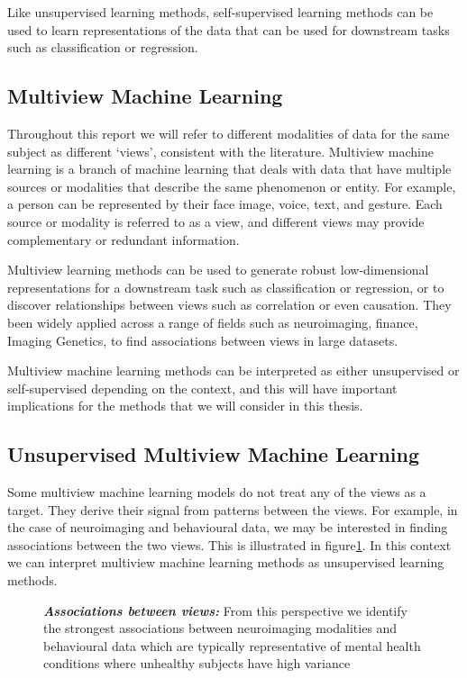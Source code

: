 Like unsupervised learning methods, self-supervised learning methods can be used to learn representations of the data that can be used for downstream tasks such as classification or regression.

\subsection{Multiview Machine Learning}

Throughout this report we will refer to different modalities of data for the same subject as different `views', consistent with the literature\cite{sun2013survey}. Multiview machine learning is a branch of machine learning that deals with data that have multiple sources or modalities that describe the same phenomenon or entity. For example, a person can be represented by their face image, voice, text, and gesture. Each source or modality is referred to as a view, and different views may provide complementary or redundant information.

Multiview learning methods can be used to generate robust low-dimensional representations for a downstream task such as classification or regression, or to discover relationships between views such as correlation or even causation. They been widely applied across a range of fields such as neuroimaging\cite{Krishnan2011}, finance\cite{cassel2000measurement}, Imaging Genetics\cite{Hansen2021}, to find associations between views in large datasets.

Multiview machine learning methods can be interpreted as either unsupervised or self-supervised depending on the context, and this will have important implications for the methods that we will consider in this thesis.

\subsection{Unsupervised Multiview Machine Learning}

Some multiview machine learning models do not treat any of the views as a target. They derive their signal from patterns between the views. For example, in the case of neuroimaging and behavioural data, we may be interested in finding associations between the two views. This is illustrated in figure\ref{fig:mentalhealthsunsupervised}. In this context we can interpret multiview machine learning methods as unsupervised learning methods.

\begin{figure}
    \centering
    \caption[Associations between views]{\textit{\textbf{Associations between views:}} From this perspective we identify the strongest associations between neuroimaging modalities and behavioural data which are typically representative of mental health conditions where unhealthy subjects have high variance}
    \label{fig:mentalhealthsunsupervised}
\end{figure}

